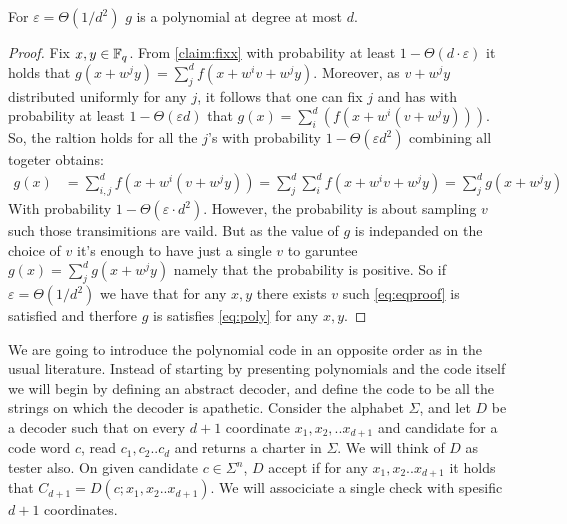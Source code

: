 \begin{claim}
  For $\varepsilon = \Theta(1/d^{2})$ $g$ is a polynomial at degree at most $d$. 
\end{claim}

\begin{proof}
  Fix $x,y \in \mathbb{F}_{q}$. From \cref{claim:fixx} with probability at least $1 - \Theta \left( d\cdot \varepsilon \right)$ it holds that $ g\left( x + w^{j}y \right) = \sum_{j}^{d}{f\left( x + w^{i}v + w^{j}y \right)}$. Moreover, as $ v+w^{j}y$ distributed uniformly for any $j$, it follows that one can fix $j$ and has with probability at least $1 - \Theta\left( \varepsilon d  \right)$ that  $g\left( x\right) = \sum_{i}^{d}{\left( f\left( x + w^{i}\left( v + w^{j}y \right) \right) \right)}$. So, the raltion holds for all the $j$'s with probability $1 - \Theta\left( \varepsilon d^{2} \right)$ combining all togeter obtains:  
  \begin{equation*}
    \label{eq:eqproof}
    \begin{split}
      g\left( x \right) &= \sum_{i,j}^{d}{f\left( x + w^{i}\left( v +w^{j}y\right) \right)} =  \sum_{j}^{d}\sum_{i}^{d}{f\left( x + w^{i}v + w^{j}y \right)} = \sum_{j}^{d}{g\left( x + w^{j}y \right)} 
    \end{split}
  \end{equation*}
  With probability $1 - \Theta \left( \varepsilon \cdot d^{2}\right)$. However, the probability is about sampling $v$ such those transimitions are vaild. But as the value of $g$ is indepanded on the choice of $v$ it's enough to have just a single $v$ to garuntee $g\left( x \right) = \sum_{j}^{d}{g\left( x + w^{j}y \right)}$ namely that the probability is positive. So if  $ \varepsilon = \Theta(1/d^{2}) $ we have that for any $x,y$ there exists $v$ such \cref{eq:eqproof} is satisfied and therfore $g$ is satisfies \cref{eq:poly} for any $x,y$. 
\end{proof}



We are going to introduce the polynomial code in an opposite order as in the usual literature. Instead of starting by presenting polynomials and the code itself we will begin by defining an abstract decoder, and define the code to be all the strings on which the decoder is apathetic. Consider the alphabet $\Sigma$, and let $D$ be a decoder such that on every $d+1$ coordinate $x_1,x_2, .. x_{d+1}$ and candidate for a code word $c$, read $c_1, c_2 .. c_{d}$ and returns a charter in $\Sigma$. We will think of $D$ as tester also. On given candidate $c \in \Sigma^{n}$, $D$ accept if for any $x_1,x_2.. x_{d+1}$ it holds that $C_{d+1} = D\left(c; x_1, x_2 .. x_{d+1} \right)$. We will associciate a single check with spesific $d+1$ coordinates.   

